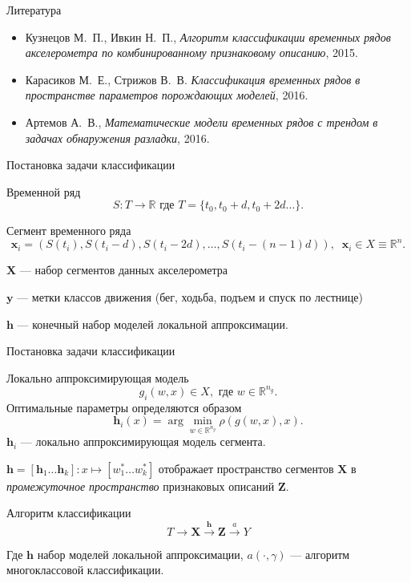 \documentclass{beamer}
\newcommand{\bx}{\mathbf{x}}
\newcommand{\by}{\mathbf{y}}
\newcommand{\bX}{\mathbf{X}}
\newcommand{\bh}{\mathbf{h}}
\newcommand{\bZ}{\mathbf{Z}}
\newcommand{\R}{\mathbb{R}}
\begin{document}
\begin{frame}{Литература}
\begin{itemize}
    \item Кузнецов М.~П., Ивкин Н.~П., \textit{Алгоритм классификации временных рядов акселерометра по комбинированному признаковому описанию}, 2015.
    \item Карасиков М.~Е., Стрижов В.~В. \textit{Классификация временных рядов в пространстве параметров порождающих моделей}, 2016.
    \item Артемов А.~В., \textit{Математические модели временных рядов с трендом в задачах обнаружения разладки}, 2016.
\end{itemize}
\end{frame}




\begin{frame}{Постановка задачи классификации}
    \begin{block}{Временной ряд}
    $$
    S: T \to \R \text{ где } T = \{t_0, t_0 + d, t_0 + 2d \ldots\}.
    $$
    \end{block}
    \begin{block}{Сегмент временного ряда}%
    $$
    \bx_i  = (S(t_i), S(t_i - d), S(t_i - 2d), \ldots, S(t_i - (n - 1)d)),
\;\; \bx_i \in X \equiv \R^n.
    $$
    \end{block}
        $\bX$ — набор сегментов данных акселерометра

        $\by$ — метки классов движения (бег, ходьба, подъем и спуск по лестнице)

        $\bh$ — конечный набор моделей локальной аппроксимации.

\end{frame}



\begin{frame}{Постановка задачи классификации}
    \begin{block}{Локально аппроксимирующая модель}
        $$
        g_i(w, x) \in X, \text{ где }w \in \R^{n_g}.
        $$
        Оптимальные параметры определяются образом
        $$
        \bh_i(x) = \arg\min_{w \in \R^{n_g}} \rho(g(w, x), x).
        $$
        $\bh_i$ — локально аппроксимирующая модель сегмента.
    \end{block}

    $\bh = [\bh_1\ldots \bh_k]: x \mapsto [w_1^* \ldots w_k^*]$
    отображает пространство сегментов $\bX$ в
    \textit{промежуточное пространство} признаковых описаний $\bZ$.
    \begin{block}{Алгоритм классификации}
        $$
        T \rightarrow \bX \xrightarrow{\bh} \bZ \xrightarrow{a} Y
        $$

        Где $\bh$ набор моделей локальной аппроксимации, $a(\cdot, \gamma)$ —
        алгоритм многоклассовой классификации.
    \end{block}
\end{frame}
\end{document}
